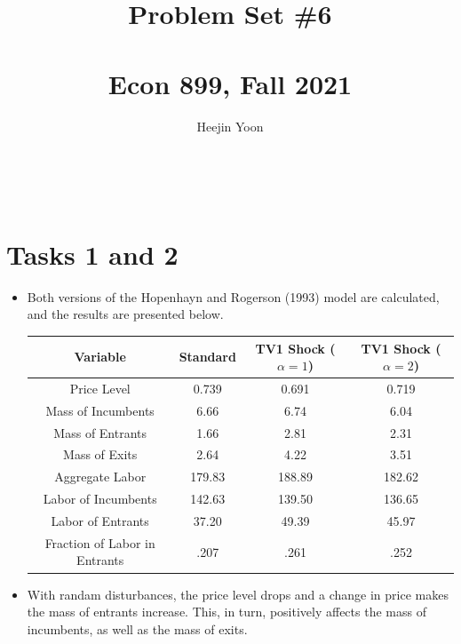 \documentclass[11pt]{article} %
\title{Problem Set \#6\\ ~\\ \large{Econ 899, Fall 2021} }
\author{Heejin Yoon}
\begin{document}
\maketitle
~\\

\section*{Tasks 1 and 2}
\begin{itemize}
	\item[] Both versions of the Hopenhayn and Rogerson (1993) model are calculated, and the results are presented below.
	
	\begin{center}
	\begin{tabular}{c|c|c|c} 
		\hline\hline
		\textbf{Variable}             & \textbf{Standard} & \textbf{TV1 Shock ($\alpha=1$)} & \textbf{TV1 Shock ($\alpha=2$)}  \\ 
		\hline\hline
		Price Level                   & 0.739             & 0.691                                            & 0.719                                             \\
		Mass of Incumbents            & 6.66              & 6.74                                             & 6.04                                              \\
		Mass of Entrants              & 1.66              & 2.81                                             & 2.31                                              \\
		Mass of Exits                 & 2.64              & 4.22                                             & 3.51                                              \\
		Aggregate Labor               & 179.83            & 188.89                                           & 182.62                                            \\
		Labor of Incumbents           & 142.63            & 139.50                                           & 136.65                                            \\
		Labor of Entrants             & 37.20             & 49.39                                            & 45.97                                             \\
		Fraction of Labor in Entrants & .207              & .261                                             & .252                                              \\
		\hline\hline
	\end{tabular}
	\end{center}
	
	\item[] With randam disturbances, the price level drops and a change in price makes the mass of entrants increase. This, in turn, positively affects the mass of incumbents, as well as the mass of exits. 
\end{itemize}
	\pagebreak
\end{document}
